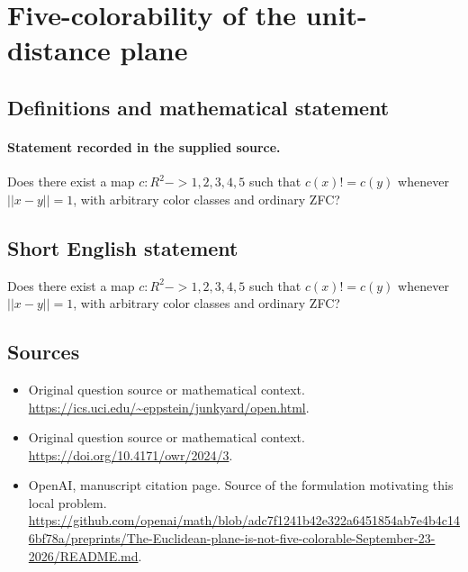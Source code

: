 \documentclass[11pt]{article}
\begin{document}
\section*{Five-colorability of the unit-distance plane}\label{30007100}
\subsection{Definitions and mathematical statement}
\paragraph{Statement recorded in the supplied source.}
Does there exist a map $c:R^2->{1,2,3,4,5}$ such that $c(x)!=c(y)$ whenever $||x-y||=1$, with arbitrary color classes and ordinary ZFC?
\subsection{Short English statement}
Does there exist a map $c:R^2->{1,2,3,4,5}$ such that $c(x)!=c(y)$ whenever $||x-y||=1$, with arbitrary color classes and ordinary ZFC?
\subsection{Sources}
\begin{itemize}
\item[S1] Original question source or mathematical context.
\url{https://ics.uci.edu/~eppstein/junkyard/open.html}.
\item[S2] Original question source or mathematical context.
\url{https://doi.org/10.4171/owr/2024/3}.
\item[S3] OpenAI, manuscript citation page. Source of the formulation motivating this local problem.
\url{https://github.com/openai/math/blob/adc7f1241b42e322a6451854ab7e4b4c146bf78a/preprints/The-Euclidean-plane-is-not-five-colorable-September-23-2026/README.md}.
\end{itemize}
\end{document}

